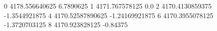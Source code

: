 0 4178.556640625 6.7890625
1 4171.767578125 0.0
2 4170.4130859375 -1.3544921875
4 4170.52587890625 -1.24169921875
6 4170.3955078125 -1.3720703125
8 4170.923828125 -0.84375
